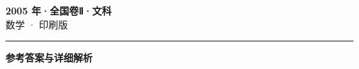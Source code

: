 \documentclass[zihao=5, a4paper]{ctexart}
\begin{document}
\begin{center}
  {\Large\bfseries 2005 年·全国卷Ⅱ·文科}\\[4pt]
  {\large 数学 · 印刷版}
\end{center}
\medskip
{}

\par\bigskip\hrule\bigskip
{}
\begin{center}{\large\bfseries 参考答案与详细解析}\end{center}
\smallskip

\end{document}
